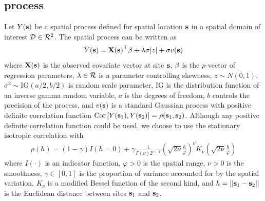 \subsection{\Skewt process} \label{sts:skewt}
Let $Y(\mathbf{s})$ be a spatial process defined for spatial location $\mathbf{s}$ in a spatial domain of interest ${\cal D} \in {\cal R}^2$.
The spatial \skewt process can be written as
\begin{align}
  Y(\mathbf{s}) = \mathbf{X}(\mathbf{s})^\top \mathbf{\beta} + \lambda \sigma |z| + \sigma v(\mathbf{s}) \label{steq:fullmodel}
\end{align}
where $\mathbf{X}(\mathbf{s})$ is the observed covariate vector at site $\mathbf{s}$, $\mathbf{\beta}$ is the $p$-vector of regression parameters, $\lambda \in {\cal R}$ is a parameter controlling skewness, $z \sim N(0, 1)$, $\sigma^2 \sim \text{IG}(a / 2, b / 2)$ is random scale parameter, IG is the distribution function of an inverse gamma random variable, $a$ is the degrees of freedom, $b$ controls the precision of the process, and $v(\mathbf{s})$ is a standard Gaussian process with positive definite correlation function $\text{Cor} \left[Y(\mathbf{s}_1), Y(\mathbf{s}_2)\right] = \rho(\mathbf{s}_1, \mathbf{s}_2)$.
Although any positive definite correlation function could be used, we choose to use the stationary isotropic \Matern correlation with
\begin{align}
  \rho(h) = (1 - \gamma) I(h = 0) + \gamma \frac{ 1 }{ \Gamma(\nu) 2^{ \nu - 1}} \left( \sqrt{2\nu} \frac{ h }{ \varphi } \right)^{\nu} K_{\nu} \left( \sqrt{2\nu} \frac{ h }{ \varphi } \right) \label{steq:matern}
\end{align}
where $I(\cdot)$ is an indicator function, $\varphi > 0$ is the spatial range, $\nu > 0$ is the smoothness, $\gamma \in [0, 1]$ is the proportion of variance accounted for by the spatial variation, $K_\nu$ is a modified Bessel function of the second kind, and $h = || \mathbf{s}_1 - \mathbf{s}_2 ||$ is the Euclidean distance between sites $\mathbf{s}_1$ and $\mathbf{s}_2$.

